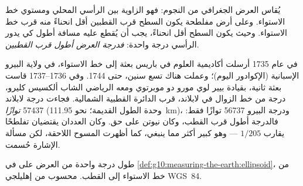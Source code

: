 يُقاس العرض الجغرافي من النجوم: فهو الزاوية بين الرأسي المحلي ومستوي خط
الاستواء. وعلى أرض مفلطحة يكون السطح قرب القطبين أقل انحناءً منه قرب خط الاستواء.
وحيث يكون السطح أقل انحناءً، يجب أن يُقطع عليه مسافة أطول كي يدور الرأسي درجة
واحدة: \emph{فدرجة العرض أطول قرب القطبين}.

\begin{history}
في عام 1735 أرسلت أكاديمية العلوم في باريس بعثة إلى خط الاستواء، في ولاية
البيرو الإسبانية (الإكوادور اليوم)؛ وعملت هناك تسع سنين، حتى 1744. وفي
1736--1737 قاست بعثة ثانية، بقيادة بيير لوي مورو دو موبرتوي ومعه الرياضي
الشاب ألكسيس كليرو، درجة من خط الزوال في لابلاند، قرب الدائرة القطبية الشمالية.
فجاءت درجة لابلاند \num{57437} \emph{توازًا} (وحدة الطول القديمة؛ نحو
\qty{111.95}{km})، ودرجة البيرو \num{56737} توازًا فقط: فالدرجة أطول قرب القطب،
وكان نيوتن على حق. وكان العددان يقتضيان تفلطحًا يقارب $1/205$ --- وهو كبير
أكثر مما ينبغي، كما أظهرت المسوح اللاحقة، لكن مسألة الإشارة حُسمت.
\end{history}

\begin{omfigure}

{\small طول درجة واحدة من العرض على  في
\cref{def:g10:measuring-the-earth:ellipsoid}، من خط الاستواء إلى القطب.
محسوب من إهليلجي WGS~84.}
\end{omfigure}

